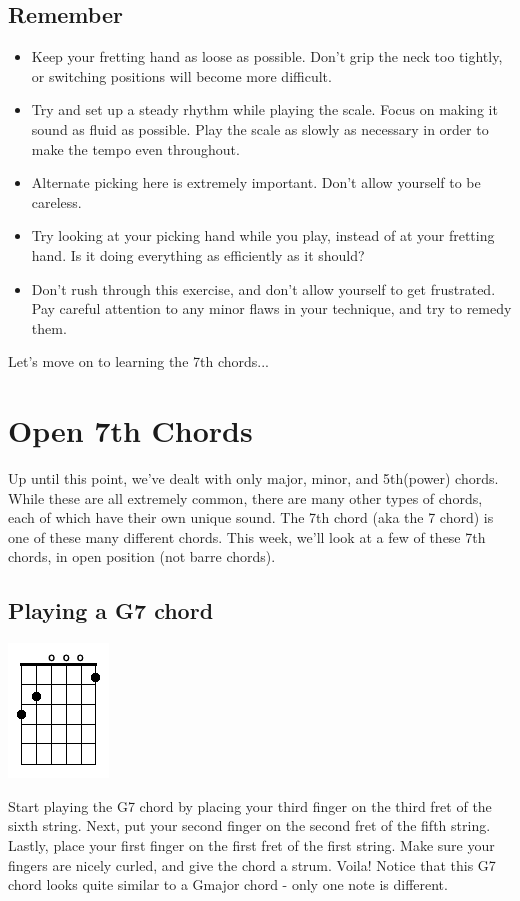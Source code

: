 \subsection{Remember}
\begin{itemize}
\item Keep your fretting hand as loose as possible. Don't grip the neck too tightly, or switching positions will become more difficult.
\item Try and set up a steady rhythm while playing the scale. Focus on making it sound as fluid as possible. Play the scale as slowly as necessary in order to make the tempo even throughout.
\item Alternate picking here is extremely important. Don't allow yourself to be careless.
\item Try looking at your picking hand while you play, instead of at your fretting hand. Is it doing everything as efficiently as it should?
\item Don't rush through this exercise, and don't allow yourself to get frustrated. Pay careful attention to any minor flaws in your technique, and try to remedy them.
\end{itemize}
Let's move on to learning the 7th chords... 

\section{Open 7th Chords}
Up until this point, we've dealt with only major, minor, and 5th(power) chords. While these are all extremely common, there are many other types of chords, each of which have their own unique sound. The 7th chord (aka the 7 chord) is one of these many different chords. This week, we'll look at a few of these 7th chords, in open position (not barre chords).

\subsection{Playing a G7 chord}
\includegraphics{partsix/openg7.png}

Start playing the G7 chord by placing your third finger on the third fret of the sixth string. Next, put your second finger on the second fret of the fifth string. Lastly, place your first finger on the first fret of the first string. Make sure your fingers are nicely curled, and give the chord a strum. Voila! Notice that this G7 chord looks quite similar to a Gmajor chord - only one note is different.

